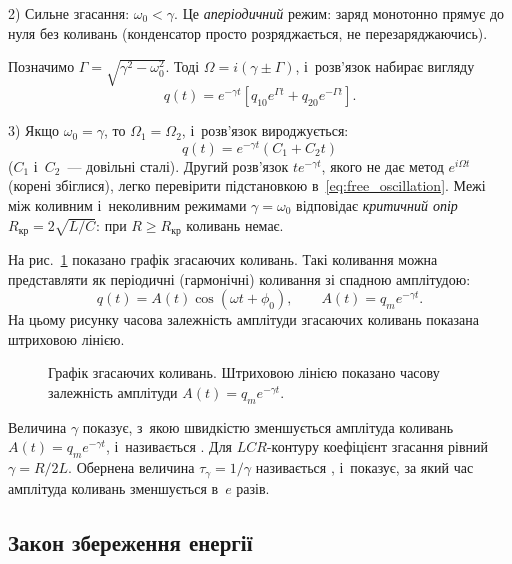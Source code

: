 2) Сильне згасання: $\omega_0 < \gamma$. Це \emph{аперіодичний} режим: заряд монотонно прямує до нуля без коливань (конденсатор просто розряджається, не перезаряджаючись).

Позначимо $\Gamma = \sqrt{\gamma^2 - \omega_0^2}$. Тоді $\Omega = i(\gamma \pm \Gamma)$, і~розв'язок набирає вигляду
\begin{equation*}
	q(t) = e^{-\gamma t}\left[q_{10} e^{\Gamma t} + q_{20} e^{-\Gamma t}\right].
\end{equation*}

3) Якщо $\omega_0 = \gamma$, то $\Omega_1 = \Omega_2$, і~розв'язок вироджується:
\begin{equation*}
	q(t) = e^{-\gamma t}\left(C_1 + C_2 t\right)
\end{equation*}
($C_1$ і~$C_2$~--- довільні сталі). Другий розв'язок $te^{-\gamma t}$, якого не дає метод $e^{i\Omega t}$ (корені збіглися), легко перевірити підстановкою в~\eqref{eq:free_oscillation}. Межі між коливним і~неколивним режимами $\gamma = \omega_0$ відповідає \emph{критичний опір} $R_{\text{кр}} = 2\sqrt{L/C}$: при $R \geqslant R_{\text{кр}}$ коливань немає.

На рис.~\ref{tikz:damped} показано графік згасаючих коливань. Такі коливання можна представляти як періодичні (гармонічні) коливання зі спадною амплітудою:
\begin{equation*}
	q(t) = A(t)\cos(\omega t + \phi_0), \qquad A(t) = q_m e^{-\gamma t}.
\end{equation*}
На цьому рисунку часова залежність амплітуди згасаючих коливань показана штриховою лінією.

\begin{figure}[h!]
	\centering
	\caption{Графік згасаючих коливань. Штриховою лінією показано часову залежність амплітуди $A(t) = q_m e^{-\gamma t}$.}
	\label{tikz:damped}
\end{figure}

Величина $\gamma$ показує, з~якою швидкістю зменшується амплітуда коливань $A(t) = q_m e^{-\gamma t}$, і~називається . Для $LCR$-контуру коефіцієнт згасання рівний $\gamma = R/2L$. Обернена величина $\tau_\gamma = 1/\gamma$ називається , і~показує, за який
час амплітуда коливань зменшується в~$e$ разів.

\subsection*{Закон збереження енергії}


